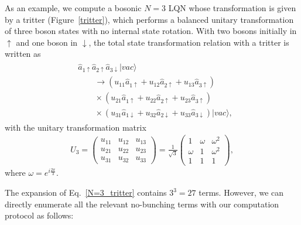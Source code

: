 \documentclass[a4paper,twocolumn,8pt,accepted=2021-12-15]{quantumarticle}
\def\w{\omega}
\def\>{\rangle}
\def\ha{{\hat{a}}}
\begin{document}
	As an example, we compute a bosonic $N=3$ LQN whose transformation is given by a tritter (Figure~\ref{tritter}), which performs a balanced unitary transformation of three boson states with no internal state rotation. With two bosons initially in $\uparrow$ and one boson in $\downarrow$, the total state transformation relation with a tritter is written as
	\begin{align}\label{N=3_tritter}
		\begin{split}
			&\ha_{1\uparrow}\ha_{2\uparrow}\ha_{3\downarrow}|vac\> \\
			&\qquad \to  (u_{11}\ha_{1\uparrow}+u_{12}\ha_{2\uparrow}+u_{13}\ha_{3\uparrow}) \\
			&\qquad \times (u_{21}\ha_{1\uparrow}+u_{22}\ha_{2\uparrow}+u_{23}\ha_{3\uparrow}) \\
			&\qquad \times (u_{31}\ha_{1\downarrow}+u_{32}\ha_{2\downarrow}+u_{33}\ha_{3\downarrow})|vac\>,
		\end{split}
	\end{align}
	with the unitary transformation matrix
	\begin{align}\label{U3}
		U_3=
		\begin{pmatrix}
			u_{11}& u_{12} & u_{13} \\
			u_{21}& u_{22} & u_{23}\\
			u_{31}&u_{32}&u_{33}
		\end{pmatrix}=
		\frac{1}{\sqrt{3}}
		\begin{pmatrix}
			1& \w & \w^2 \\
			\w& 1 & \w^2\\
			1&1&1
		\end{pmatrix},
	\end{align} where $\w=e^{i\frac{2\pi}{3}}$.
	
	The expansion of Eq.~\eqref{N=3_tritter} contains $3^3=27$ terms. However, we can directly enumerate all the relevant no-bunching terms with our computation protocol as follows:
	
	
	
\end{document}
